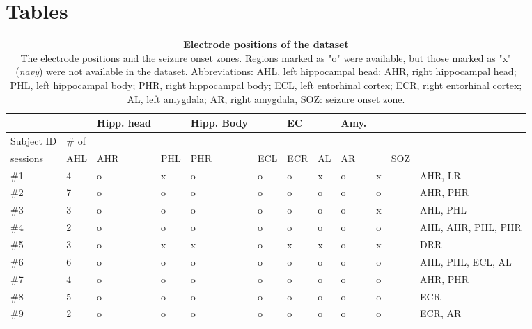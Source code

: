 \documentclass[final,3p,times,twocolumn]{elsarticle}
\begin{document}
\section*{Tables}
\label{tables}
\begin{table}[ht]
\centering
{}
\begin{tabular}{|l|l|l|l|l|l|l|l|l|l|l|l|}
\hline
&&Hipp. head&&Hipp. Body&&EC&&Amy.&&&\\
\hline
Subject ID&\# of &&&&&&&&&&\\
\hline
sessions&AHL&AHR&PHL&PHR&ECL&ECR&AL&AR&&SOZ&\\
\hline
\#1&4&o&x&o&o&o&x&o&x&&AHR, LR\\
\hline
\#2&7&o&o&o&o&o&o&o&o&&AHR, PHR\\
\hline
\#3&3&o&o&o&o&o&o&o&x&&AHL, PHL\\
\hline
\#4&2&o&o&o&o&o&o&o&o&&AHL, AHR, PHL, PHR\\
\hline
\#5&3&o&x&x&o&x&x&o&x&&DRR\\
\hline
\#6&6&o&o&o&o&o&o&o&o&&AHL, PHL, ECL, AL\\
\hline
\#7&4&o&o&o&o&o&o&o&o&&AHR, PHR\\
\hline
\#8&5&o&o&o&o&o&o&o&o&&ECR\\
\hline
\#9&2&o&o&o&o&o&o&o&o&&ECR, AR\\
\hline
\bottomrule
\end{tabular}
\caption{\textbf{
Electrode positions of the dataset
}
\smallskip
\\
The electrode positions and the seizure onset zones. Regions marked as "o" were available, but those marked as "x" (\textit{navy}) were not available in the dataset. Abbreviations: AHL, left hippocampal head; AHR, right hippocampal head; PHL, left hippocampal body; PHR, right hippocampal body; ECL, left entorhinal cortex; ECR, right entorhinal cortex; AL, left amygdala; AR, right amygdala, SOZ: seizure onset zone.
}
\end{table}
\clearpage
{}
\end{document}
